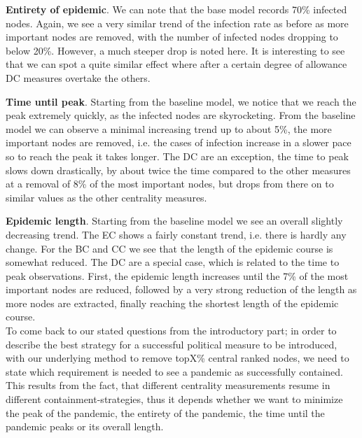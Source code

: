 \documentclass{Template_resources/netsci-project}
\begin{document}
\textbf{Entirety of epidemic}. We can note that the base model records 70\% infected nodes. Again, we see a very similar trend of the infection rate as before as more important nodes are removed, with the number of infected nodes dropping to below 20\%.  However, a much steeper drop is noted here. It is interesting to see that we can spot a quite similar effect where after a certain degree of allowance DC measures overtake the others.

\textbf{Time until peak}. Starting from the baseline model, we notice that we reach the peak extremely quickly, as the infected nodes are skyrocketing. From the baseline model we can observe a minimal increasing trend up to about 5\%, the more important nodes are removed, i.e. the cases of infection increase in a slower pace so to reach the peak it takes longer. The DC are an exception, the time to peak slows down drastically, by about twice the time compared to the other measures at a removal of 8\% of the most important nodes, but drops from there on to similar values as the other centrality measures.

\textbf{Epidemic length}. Starting from the baseline model we see an overall slightly decreasing trend. The EC shows a fairly constant trend, i.e. there is hardly any change. For the BC and CC we see that the length of the epidemic course is somewhat reduced. The DC are a special case, which is related to the time to peak observations. First, the epidemic length increases until the 7\% of the most important nodes are reduced, followed by a very strong reduction of the length as more nodes are extracted, finally reaching the shortest length of the epidemic course.\\


To come back to our stated questions from the introductory part; in order to describe the best strategy for a successful political measure to be introduced, with our underlying method to remove topX\% central ranked nodes, we need to state which requirement is needed to see a pandemic as successfully contained. This results from the fact, that different centrality measurements resume in different containment-strategies, thus it depends whether we want to minimize the peak of the pandemic, the entirety of the pandemic, the time until the pandemic peaks or its overall length. 
\end{document}
